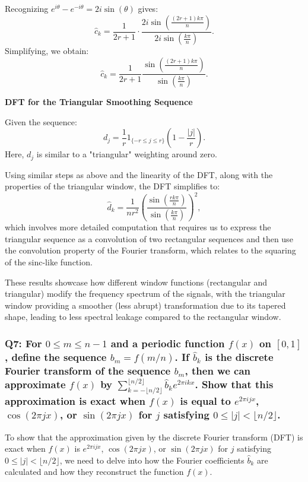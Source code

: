 \documentclass[8pt]{article}
\begin{document}
Recognizing \( e^{i \theta} - e^{-i \theta} = 2i \sin(\theta) \) gives:
\[ \hat{c}_k = \frac{1}{2r+1} \cdot \frac{2i \sin \left(\frac{(2r+1)k\pi}{n}\right)}{2i \sin \left(\frac{k\pi}{n}\right)}. \]
Simplifying, we obtain:
\[ \hat{c}_k = \frac{1}{2r+1} \frac{\sin \left(\frac{(2r+1)k\pi}{n}\right)}{\sin \left(\frac{k\pi}{n}\right)}. \]

\textbf{DFT for the Triangular Smoothing Sequence}

Given the sequence:
\[ d_j = \frac{1}{r} 1_{\{-r \leq j \leq r\}} \left(1 - \frac{|j|}{r}\right). \]
Here, \(d_j\) is similar to a "triangular" weighting around zero.

Using similar steps as above and the linearity of the DFT, along with the properties of the triangular window, the DFT simplifies to:
\[ \hat{d}_k = \frac{1}{nr^2} \left(\frac{\sin \left(\frac{rk\pi}{n}\right)}{\sin \left(\frac{k\pi}{n}\right)}\right)^2, \]
which involves more detailed computation that requires us to express the triangular sequence as a convolution of two rectangular sequences and then use the convolution property of the Fourier transform, which relates to the squaring of the sinc-like function.

These results showcase how different window functions (rectangular and triangular) modify the frequency spectrum of the signals, with the triangular window providing a smoother (less abrupt) transformation due to its tapered shape, leading to less spectral leakage compared to the rectangular window.

\subsubsection*{Q7:
For \(0 \leq m \leq n - 1\) and a periodic function \(f(x)\) on \([0,1]\), define the sequence \(b_m = f(m/n)\). If \(\hat{b}_k\) is the discrete Fourier transform of the sequence \(b_m\), then we can approximate \(f(x)\) by \(\sum_{k=-\lfloor n/2 \rfloor}^{\lfloor n/2 \rfloor} \hat{b}_k e^{2\pi ikx}\). Show that this approximation is exact when \(f(x)\) is equal to \(e^{2\pi ijx}\), \(\cos(2\pi jx)\), or \(\sin(2\pi jx)\) for \(j\) satisfying \(0 \leq |j| < \lfloor n/2 \rfloor\).}

To show that the approximation given by the discrete Fourier transform (DFT) is exact when \(f(x)\) is \(e^{2\pi ijx}\), \(\cos(2\pi jx)\), or \(\sin(2\pi jx)\) for \(j\) satisfying \(0 \leq |j| < \lfloor n/2 \rfloor\), we need to delve into how the Fourier coefficients \(\hat{b}_k\) are calculated and how they reconstruct the function \(f(x)\).
\end{document}
